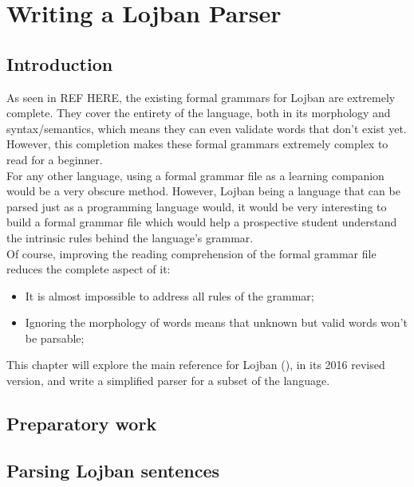 \chapter{Writing a Lojban Parser}

\section{Introduction}

As seen in REF HERE, the existing formal grammars for Lojban are extremely complete. They cover the entirety of the language, both in its morphology and syntax/semantics, which means they can even validate words that don't exist yet. However, this completion makes these formal grammars extremely complex to read for a beginner. \\

For any other language, using a formal grammar file as a learning companion would be a very obscure method. However, Lojban being a language that can be parsed just as a programming language would, it would be very interesting to build a formal grammar file which would help a prospective student understand the intrinsic rules behind the language's grammar. \\

Of course, improving the reading comprehension of the formal grammar file reduces the complete aspect of it:

\begin{itemize}
  \item It is almost impossible to address all rules of the grammar;
  \item Ignoring the morphology of words means that unknown but valid words won't be parsable;
\end{itemize}

This chapter will explore the main reference for Lojban (\cite{cowan1997complete}), in its 2016 revised version, and write a simplified parser for a subset of the language.

\newpage

\section{Preparatory work}

\section{Parsing Lojban sentences}
\label{sec:parsing_lojban_sentences}

